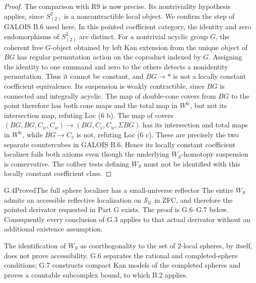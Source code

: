 \begin{proof}
The comparison with R9 is now precise. Its nontriviality hypothesis applies, since $S^2_{(2)}$ is a noncontractible local object. We confirm the step of GALOIS B.6 used here. In this pointed coefficient category, the identity and zero endomorphisms of $S^2_{(2)}$ are distinct. For a nontrivial acyclic group $G$, the coherent free $G$-object obtained by left Kan extension from the unique object of $BG$ has regular permutation action on the coproduct indexed by $G$. Assigning the identity to one summand and zero to the others detects a nonidentity permutation. Thus it cannot be constant, and $BG\to *$ is not a locally constant coefficient equivalence. Its suspension is weakly contractible, since $BG$ is connected and integrally acyclic. The map of double-cone covers from $BG$ to the point therefore has both cone maps and the total map in $W^{\mathrm{lc}}$, but not its intersection map, refuting Loc (6 b). The map of covers $(BG,BG,C_w,C_w)\to(BG,C_v,C_w,\Sigma BG)$ has its intersection and total maps in $W^{\mathrm{lc}}$, while $BG\to C_v$ is not, refuting Loc (6 c). These are precisely the two separate countercubes in GALOIS B.6. Hence its locally constant coefficient localizer fails both axioms even though the underlying $W_S$-homotopy suspension is conservative. The cofiber tests defining $W_S$ must not be identified with this locally constant coefficient class.
\end{proof}

\begin{claim}{G.4}{Proved}{The full sphere localizer has a small-universe reflector}
The entire $W_S$ admits an accessible reflective localization on $\mathcal S_{\mathcal U}$ in ZFC, and therefore the pointed derivator requested in Part G exists. The proof is G.6--G.7 below. Consequently every conclusion of G.3 applies to that actual derivator without an additional existence assumption.
\end{claim}
The identification of $W_S$ as coorthogonality to the set of $2$-local spheres, by itself, does not prove accessibility. G.6 separates the rational and completed-sphere conditions; G.7 constructs compact Kan models of the completed spheres and proves a countable subcomplex bound, to which B.2 applies.

